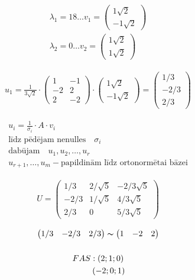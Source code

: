 \documentclass[12pt]{article}
\begin{document}
\begin{gather*}
	\lambda_1 = 18 \ldots v_1 =
	\begin{pmatrix}
		1\sqrt2 \\
		-1\sqrt2
	\end{pmatrix}
	\\
	\lambda_2 = 0 \ldots v_2 =
	\begin{pmatrix}
		1\sqrt2 \\
		1\sqrt2
	\end{pmatrix}
\end{gather*}

\begin{gather*}
	u_1 = \frac{1}{3\sqrt2} \cdot
	\begin{pmatrix}
		1 & -1 \\
		-2 & 2 \\
		2 & -2 
	\end{pmatrix}
	\cdot
	\begin{pmatrix}
		1\sqrt2 \\
		-1\sqrt2
	\end{pmatrix}
	=
	\begin{pmatrix}
		1/3 \\
		-2/3 \\
		2/3
	\end{pmatrix}
\end{gather*}

\begin{gather}
	u_i  = \frac{1}{\sigma_i} \cdot A \cdot v_i \\
	\text{līdz pēdējam nenulles} \quad \sigma_i \\
	\text{dabūjam} \quad u_1, u_2, \ldots, u_r \\
	u_{r+1}, \ldots, u_m - \text{papildinām līdz ortonormētai bāzei}
\end{gather}

\pagebreak


\begin{gather}
	U =
	\begin{pmatrix}
		1/3 & 2/\sqrt5 & -2/3\sqrt5 \\
		-2/3 & 1/\sqrt5 & 4/3\sqrt5 \\
		2/3 & 0 & 5/3\sqrt5
	\end{pmatrix}
\end{gather}


\begin{gather}
	\begin{pmatrix}
		1/3 & -2/3 & 2/3
	\end{pmatrix}
	\thicksim
	\begin{pmatrix}
		1 & -2 & 2
	\end{pmatrix}
	\\ \\
	FAS: (2; 1; 0) \\
	\quad \quad \; \; (-2; 0; 1) %
\end{gather}
\end{document}
